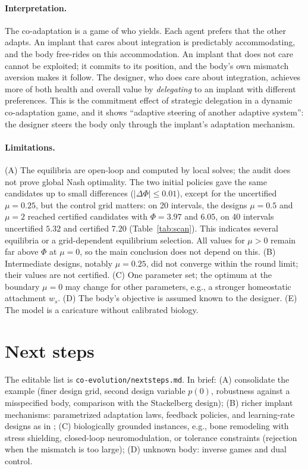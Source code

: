 \documentclass[11pt,a4paper]{article}
\begin{document}
\paragraph{Interpretation.}
The co-adaptation is a game of who yields. Each agent prefers that the other adapts. An
implant that cares about integration is predictably accommodating, and the body
free-rides on this accommodation. An implant that does not care cannot be exploited; it
commits to its position, and the body's own mismatch aversion makes it follow. The
designer, who does care about integration, achieves more of both health and overall value
by \emph{delegating} to an implant with different preferences. This is the commitment effect of
strategic delegation \citep{Vickers1985,FershtmanJudd1987} in a dynamic co-adaptation
game, and it shows ``adaptive steering of another adaptive system'': the designer steers
the body only through the implant's adaptation mechanism.

\paragraph{Limitations.}
(A) The equilibria are open-loop and computed by local solves; the audit does not prove
global Nash optimality. The two initial policies gave the same candidates up to small differences
($|\Delta\Phi|\le0.01$), except for the uncertified $\mu=0.25$, but the control grid matters: on 20 intervals, the designs $\mu=0.5$ and $\mu=2$
reached certified candidates with $\Phi=3.97$ and $6.05$, on 40 intervals uncertified $5.32$
and certified $7.20$ (Table~\ref{tab:scan}). This indicates several equilibria or a
grid-dependent equilibrium selection. All values for $\mu>0$ remain far above $\Phi$ at
$\mu=0$, so the main conclusion does not depend on this. (B) Intermediate designs, notably $\mu=0.25$, did not
converge within the round limit; their values are not certified. (C) One parameter set; the
optimum at the boundary $\mu=0$ may change for other parameters, e.g., a stronger
homeostatic attachment $w_s$. (D) The body's objective is assumed known to the designer.
(E) The model is a caricature without calibrated biology.

\section{Next steps}
The editable list is \texttt{co-evolution/nextsteps.md}. In brief:
(A) consolidate the example (finer design grid, second design variable $p(0)$,
robustness against a misspecified body, comparison with the Stackelberg design);
(B) richer implant mechanisms: parametrized adaptation laws, feedback policies, and
learning-rate designs as in \citep{Madduri2024};
(C) biologically grounded instances, e.g., bone remodeling with stress shielding,
closed-loop neuromodulation, or tolerance constraints (rejection when the mismatch is too
large); (D) unknown body: inverse games and dual control.



\end{document}
